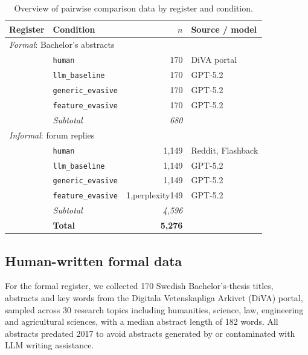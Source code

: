 \documentclass[thesis]{cluu}
\begin{document}
\begin{table}[H]
  \centering
  \small
  \begin{tabular}{llrl}
    \toprule
    Register & Condition & $n$ & Source / model \\
    \midrule
    \multicolumn{4}{l}{\textit{Formal}: Bachelor's abstracts}\\
    \addlinespace[2pt]
    & \texttt{human}  & 170 & DiVA portal \\
    & \texttt{llm\_baseline} & 170 & GPT-5.2 \\
    & \texttt{generic\_evasive} & 170 & GPT-5.2 \\
    & \texttt{feature\_evasive} & 170 & GPT-5.2 \\
    \addlinespace[2pt]
    & \textit{Subtotal} & \textit{680} & \\
    \midrule
    \multicolumn{4}{l}{\textit{Informal}: forum replies}\\
    \addlinespace[2pt]
    & \texttt{human}   & 1{,}149 & Reddit, Flashback \\
    & \texttt{llm\_baseline}& 1{,}149 & GPT-5.2 \\
    & \texttt{generic\_evasive} & 1{,}149 & GPT-5.2 \\
    & \texttt{feature\_evasive} & 1{,perplexity}149 & GPT-5.2 \\
    \addlinespace[2pt]
    & \textit{Subtotal} & \textit{4{,}596} & \\
    \midrule
    & \textbf{Total} & \textbf{5{,}276} & \\
    \bottomrule
  \end{tabular}
    \label{tab:data-overview}
  \caption[Overview of the collected and generated data]{%
    Overview of pairwise comparison data by register and condition.}
  \begin{minipage}{\textwidth}
    \footnotesize
  \end{minipage}
\end{table}

\subsection{Human-written formal data}

For the formal register, we collected 170 Swedish Bachelor's-thesis titles, abstracts and key words from the Digitala Vetenskapliga Arkivet (DiVA) portal, sampled across 30 research topics including humanities, science, law, engineering and agricultural sciences, with a median abstract length of 182 words. All abstracts predated 2017 to avoid abstracts generated by or contaminated with LLM writing assistance.
\end{document}
